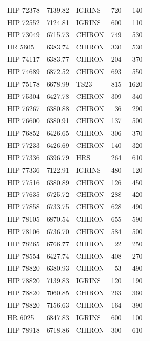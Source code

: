 \begin{scriptsize}
\begin{longtable}{|l|rlrr|}
   HIP 72378 &  7139.82 &     IGRINS &      720 &   140 \\
   HIP 72552 &  7124.81 &     IGRINS &      600 &   110 \\
   HIP 73049 &  6715.73 &     CHIRON &      749 &   530 \\
     HR 5605 &  6383.74 &     CHIRON &      330 &   530 \\
   HIP 74117 &  6383.77 &     CHIRON &      204 &   370 \\
   HIP 74689 &  6872.52 &     CHIRON &      693 &   550 \\
   HIP 75178 &  6678.99 &       TS23 &      815 &  1620 \\
   HIP 75304 &  6427.78 &     CHIRON &      309 &   340 \\
   HIP 76267 &  6380.88 &     CHIRON &       36 &   290 \\
   HIP 76600 &  6380.91 &     CHIRON &      137 &   500 \\
   HIP 76852 &  6426.65 &     CHIRON &      306 &   370 \\
   HIP 77233 &  6426.69 &     CHIRON &      140 &   320 \\
   HIP 77336 &  6396.79 &        HRS &      264 &   610 \\
   HIP 77336 &  7122.91 &     IGRINS &      480 &   120 \\
   HIP 77516 &  6380.89 &     CHIRON &      126 &   450 \\
   HIP 77635 &  6725.72 &     CHIRON &      288 &   420 \\
   HIP 77858 &  6733.75 &     CHIRON &      628 &   490 \\
   HIP 78105 &  6870.54 &     CHIRON &      655 &   590 \\
   HIP 78106 &  6736.70 &     CHIRON &      584 &   500 \\
   HIP 78265 &  6766.77 &     CHIRON &       22 &   250 \\
   HIP 78554 &  6427.74 &     CHIRON &      408 &   270 \\
   HIP 78820 &  6380.93 &     CHIRON &       53 &   490 \\
   HIP 78820 &  7139.83 &     IGRINS &      120 &   190 \\
   HIP 78820 &  7060.85 &     CHIRON &      263 &   360 \\
   HIP 78820 &  7156.63 &     CHIRON &      164 &   390 \\
     HR 6025 &  6847.83 &     IGRINS &      600 &   100 \\
   HIP 78918 &  6718.86 &     CHIRON &      300 &   610 \\

\end{longtable}
\end{scriptsize}
